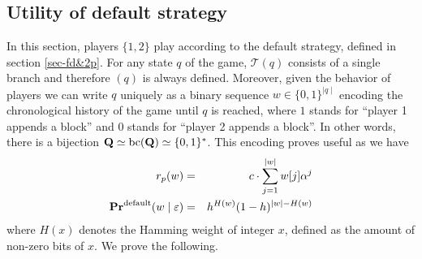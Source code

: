 %
%
%
\subsection{Utility of default strategy}
In this section, players $\{1,2\}$ play according to the default strategy, defined in section \ref{sec-fd&2p}. For any state $q$ of the game, $\mathcal{T}(q)$ consists of a single branch and therefore \bchain$(q)$ is always defined. Moreover, given the behavior of players we can write $q$ uniquely as a binary sequence $w\in\{0,1\}^{\mid q\mid }$ encoding the chronological history of the game until $q$ is reached, where $1$ stands for ``player 1 appends a block'' and $0$ stands for ``player 2 appends a block''. In other words, there is a bijection $ \mathbf{Q} \simeq\text{bc}(\mathbf{Q})\simeq \{0,1\}^\ast$. This encoding proves useful as we have
\begin{eqnarray*}
	r_p(w) &=&	c\cdot \sum_{j=1}^{\mid w\mid}w[j] \alpha^j  \\
	\mathbf{Pr}^{\text{\rm default}}(w \mid \varepsilon) &=&	h^{H(w)}(1-h)^{|w|-H(w)}
\end{eqnarray*}
where $H(x)$ denotes the Hamming weight of integer $x$, defined as the amount of non-zero bits of $x$. We prove the following.


